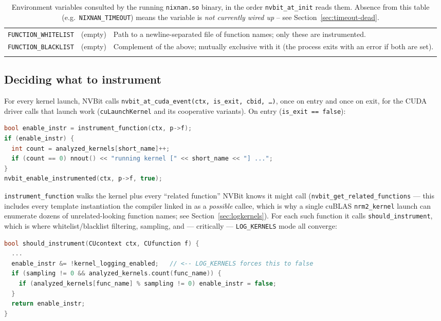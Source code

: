\documentclass[11pt]{article}
\begin{document}
\begin{longtable}{p{3.2cm}p{2.3cm}p{8.2cm}}
\texttt{FUNCTION\_WHITELIST} & (empty) & Path to a newline-separated file of function names; only these are instrumented. \\
\texttt{FUNCTION\_BLACKLIST} & (empty) & Complement of the above; mutually exclusive with it (the process exits with an error if both are set). \\
\bottomrule
\caption{Environment variables consulted by the running \texttt{nixnan.so} binary, in the order \texttt{nvbit\_at\_init} reads them. Absence from this table (e.g.\ \texttt{NIXNAN\_TIMEOUT}) means the variable is \emph{not currently wired up} -- see Section~\ref{sec:timeout-dead}.}
\label{tab:envvars}
\end{longtable}

\subsection{Deciding what to instrument}

For every kernel launch, NVBit calls
\texttt{nvbit\_at\_cuda\_event(ctx, is\_exit, cbid, \ldots)}, once on entry
and once on exit, for the CUDA driver calls that launch work
(\texttt{cuLaunchKernel} and its cooperative variants). On entry
(\texttt{is\_exit == false}):

\begin{lstlisting}[language=C++]
bool enable_instr = instrument_function(ctx, p->f);
if (enable_instr) {
  int count = analyzed_kernels[short_name]++;
  if (count == 0) nnout() << "running kernel [" << short_name << "] ...";
}
nvbit_enable_instrumented(ctx, p->f, true);
\end{lstlisting}

\texttt{instrument\_function} walks the kernel plus every ``related
function'' NVBit knows it might call (\texttt{nvbit\_get\_related\_functions}
--- this includes every template instantiation the compiler linked in as a
\emph{possible} callee, which is why a single cuBLAS \texttt{nrm2\_kernel}
launch can enumerate dozens of unrelated-looking function names; see
Section~\ref{sec:logkernels}). For each such function it calls
\texttt{should\_instrument}, which is where whitelist/blacklist filtering,
sampling, and --- critically --- \texttt{LOG\_KERNELS} mode all converge:

\begin{lstlisting}[language=C++]
bool should_instrument(CUcontext ctx, CUfunction f) {
  ...
  enable_instr &= !kernel_logging_enabled;   // <-- LOG_KERNELS forces this to false
  if (sampling != 0 && analyzed_kernels.count(func_name)) {
    if (analyzed_kernels[func_name] % sampling != 0) enable_instr = false;
  }
  return enable_instr;
}
\end{lstlisting}
\end{document}
